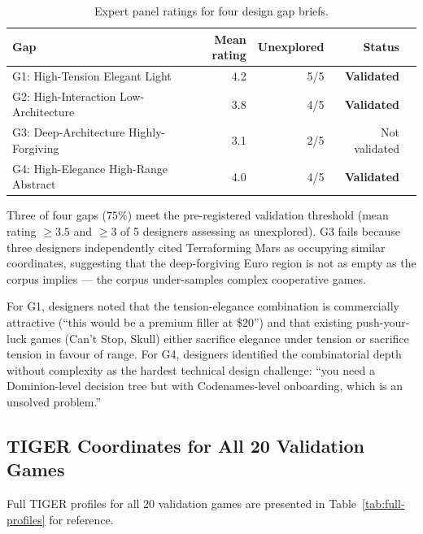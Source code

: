 \begin{table}[h]
\centering
\caption{Expert panel ratings for four design gap briefs.}
\label{tab:validation}
\begin{tabular}{lrrrl}
\hline
\textbf{Gap} & \textbf{Mean rating} & \textbf{Unexplored} & \textbf{Status} \\
\hline
G1: High-Tension Elegant Light & 4.2 & 5/5 & \textbf{Validated} \\
G2: High-Interaction Low-Architecture & 3.8 & 4/5 & \textbf{Validated} \\
G3: Deep-Architecture Highly-Forgiving & 3.1 & 2/5 & Not validated \\
G4: High-Elegance High-Range Abstract & 4.0 & 4/5 & \textbf{Validated} \\
\hline
\end{tabular}
\end{table}

Three of four gaps ($75\%$) meet the pre-registered validation threshold (mean rating
$\geq 3.5$ and $\geq 3$ of 5 designers assessing as unexplored). G3 fails because
three designers independently cited Terraforming Mars as occupying similar coordinates,
suggesting that the deep-forgiving Euro region is not as empty as the corpus implies
--- the corpus under-samples complex cooperative games.

For G1, designers noted that the tension-elegance combination is commercially attractive
(``this would be a premium filler at \$20'') and that existing push-your-luck games
(Can't Stop, Skull) either sacrifice elegance under tension or sacrifice tension in
favour of range. For G4, designers identified the combinatorial depth without complexity
as the hardest technical design challenge: ``you need a Dominion-level decision tree
but with Codenames-level onboarding, which is an unsolved problem.''

\subsection{TIGER Coordinates for All 20 Validation Games}

Full TIGER profiles for all 20 validation games are presented in
Table~\ref{tab:full-profiles} for reference.

